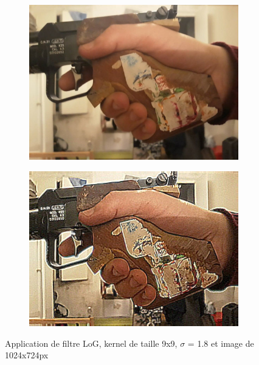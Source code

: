         \begin{figure}[!h]
            \centering
            \begin{subfigure}[b]{0.4\textwidth}
                \includegraphics[width=1\textwidth]{report_src/effects/sharpen2.jpg}
            \end{subfigure}
            \begin{subfigure}[b]{0.4\textwidth}
                \includegraphics[width=1\textwidth]{report_src/effects/org2.jpg}
            \end{subfigure}
            \caption*{Application de filtre LoG, kernel de taille 9x9, $\sigma$ = 1.8 et image de 1024x724px}
        \end{figure} 
 



